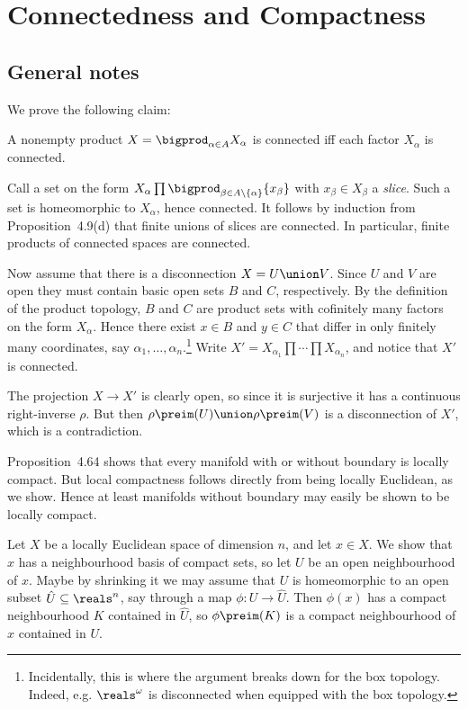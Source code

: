 \documentclass[article, a4paper, 11pt, oneside]{memoir}
\numberwithin{equation}{chapter}
\theoremstyle{nonumberplain}
\newenvironment{displaytheorem}{%
	\begin{displayquote}\itshape%
}{%
	\end{displayquote}%
}
\begin{document}
\chapter{Connectedness and Compactness}

\section*{General notes}

\begin{remarkbreak}
    We prove the following claim:
    \begin{displaytheorem}
        A nonempty product $X = \bigprod_{\alpha \in A} X_\alpha$ is connected iff each factor $X_\alpha$ is connected.
    \end{displaytheorem}
    Call a set on the form $X_\alpha \prod \bigprod_{\beta \in A \setminus \{\alpha\}} \{x_\beta\}$ with $x_\beta \in X_\beta$ a \emph{slice}. Such a set is homeomorphic to $X_\alpha$, hence connected. It follows by induction from Proposition~4.9(d) that finite unions of slices are connected. In particular, finite products of connected spaces are connected.

    Now assume that there is a disconnection $X = U \union V$. Since $U$ and $V$ are open they must contain basic open sets $B$ and $C$, respectively. By the definition of the product topology, $B$ and $C$ are product sets with cofinitely many factors on the form $X_\alpha$. Hence there exist $x \in B$ and $y \in C$ that differ in only finitely many coordinates, say $\alpha_1, \ldots, \alpha_n$.\footnote{Incidentally, this is where the argument breaks down for the box topology. Indeed, e.g. $\reals^\omega$ is disconnected when equipped with the box topology.} Write $X' = X_{\alpha_1} \prod \cdots \prod X_{\alpha_n}$, and notice that $X'$ is connected.

    The projection $X \to X'$ is clearly open, so since it is surjective it has a continuous right-inverse $\rho$. But then $\rho\preim(U) \union \rho\preim(V)$ is a disconnection of $X'$, which is a contradiction.
\end{remarkbreak}


\begin{remarkbreak}
    Proposition~4.64 shows that every manifold with or without boundary is locally compact. But local compactness follows directly from being locally Euclidean, as we show. Hence at least manifolds without boundary may easily be shown to be locally compact.

    Let $X$ be a locally Euclidean space of dimension $n$, and let $x \in X$. We show that $x$ has a neighbourhood basis of compact sets, so let $U$ be an open neighbourhood of $x$. Maybe by shrinking it we may assume that $U$ is homeomorphic to an open subset $\hat{U} \subseteq \reals^n$, say through a map $\phi \colon U \to \hat{U}$. Then $\phi(x)$ has a compact neighbourhood $K$ contained in $\hat{U}$, so $\phi\preim(K)$ is a compact neighbourhood of $x$ contained in $U$.
\end{remarkbreak}
\end{document}
